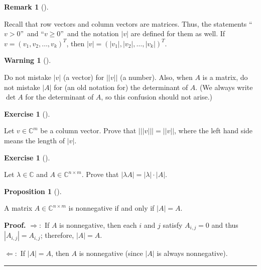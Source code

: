 \documentclass[numbers=enddot,12pt,final,onecolumn,notitlepage]{scrartcl}%
\newcounter{exer}
\numberwithin{exer}{subsection}
\theoremstyle{definition}
\newtheorem{prop}[theo]{Proposition}
\newenvironment{proposition}[1][]
{\begin{prop}[#1]\begin{leftbar}}
{\end{leftbar}\end{prop}}
\newtheorem{remk}[theo]{Remark}
\newenvironment{remark}[1][]
{\begin{remk}[#1]\begin{leftbar}}
{\end{leftbar}\end{remk}}
\newtheorem{warn}[theo]{Warning}
\newenvironment{warning}[1][]
{\begin{warn}[#1]\begin{leftbar}}
{\end{leftbar}\end{warn}}
\newtheorem{exmp}[exer]{Exercise}
\newenvironment{exercise}[1][]
{\begin{exmp}[#1]\begin{leftbar}}
{\end{leftbar}\end{exmp}}
\newenvironment{proof}[1][Proof]{\noindent\textbf{#1.} }{\ \rule{0.5em}{0.5em}}
\newenvironment{warning}[1][Warning]{\noindent\textbf{#1.} }{\ \rule{0.5em}{0.5em}}
\begin{document}
\begin{remark}
Recall that row vectors and column vectors are matrices. Thus, the statements
\textquotedblleft$v>0$\textquotedblright\ and \textquotedblleft$v\geq
0$\textquotedblright\ and the notation $\left\vert v\right\vert $ are defined
for them as well. If $v=\left(  v_{1},v_{2},\ldots,v_{k}\right)  ^{T}$, then
$\left\vert v\right\vert =\left(  \left\vert v_{1}\right\vert ,\left\vert
v_{2}\right\vert ,\ldots,\left\vert v_{k}\right\vert \right)  ^{T}$.
\end{remark}

\begin{warning}
Do not mistake $\left\vert v\right\vert $ (a vector) for $\left\vert
\left\vert v\right\vert \right\vert $ (a number). Also, when $A$ is a matrix,
do not mistake $\left\vert A\right\vert $ for (an old notation for) the
determinant of $A$. (We always write $\det A$ for the determinant of $A$, so
this confusion should not arise.)
\end{warning}

\begin{exercise}
 Let $v\in\mathbb{C}^{m}$ be a column vector. Prove that $\left\vert
\left\vert \left\vert v\right\vert \right\vert \right\vert =\left\vert
\left\vert v\right\vert \right\vert $, where the left hand side means the
length of $\left\vert v\right\vert $.
\end{exercise}

\begin{exercise}
\label{exe.posmat.abs-lamA} Let $\lambda\in\mathbb{C}$ and
$A\in\mathbb{C}^{n\times m}$. Prove that $\left\vert \lambda A\right\vert
=\left\vert \lambda\right\vert \cdot\left\vert A\right\vert $.
\end{exercise}

\begin{proposition}
A matrix $A\in\mathbb{C}^{n\times m}$ is nonnegative if and only if
$\left\vert A\right\vert =A$.
\end{proposition}

\begin{proof}
$\Longrightarrow:$ If $A$ is nonnegative, then each $i$ and $j$ satisfy
$A_{i,j}=0$ and thus $\left\vert A_{i,j}\right\vert =A_{i,j}$; therefore,
$\left\vert A\right\vert =A$.

$\Longleftarrow:$ If $\left\vert A\right\vert =A$, then $A$ is nonnegative
(since $\left\vert A\right\vert $ is always nonnegative).
\end{proof}
\end{document}
